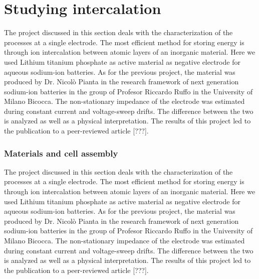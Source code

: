 \chapter{Studying intercalation}

The project discussed in this section deals with the characterization of the processes at a single electrode. The most efficient method for storing energy is through ion intercalation between atomic layers of an inorganic material. Here we used Lithium titanium phosphate as active material as negative electrode for aqueous sodium-ion batteries.  As for the previous project, the material was produced by Dr. Nicolò Pianta in the research framework of next generation sodium-ion batteries in the group of Profesor Riccardo Ruffo in the University of Milano Bicocca. The non-stationary impedance of the electrode was estimated during constant current and voltage-sweep drifts. The difference between the two is analyzed as well as a physical interpretation. The results of this project led to the publication to a peer-reviewed article [???].

\subsection{Materials and cell assembly}
The project discussed in this section deals with the characterization of the processes at a single electrode. The most efficient method for storing energy is through ion intercalation between atomic layers of an inorganic material. Here we used Lithium titanium phosphate as active material as negative electrode for aqueous sodium-ion batteries.  As for the previous project, the material was produced by Dr. Nicolò Pianta in the research framework of next generation sodium-ion batteries in the group of Profesor Riccardo Ruffo in the University of Milano Bicocca. The non-stationary impedance of the electrode was estimated during constant current and voltage-sweep drifts. The difference between the two is analyzed as well as a physical interpretation. The results of this project led to the publication to a peer-reviewed article [???].

